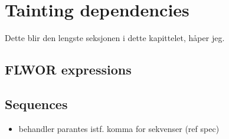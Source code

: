 \section{Tainting dependencies}
\label{sect:impl:tainting_deps}
Dette blir den lengste seksjonen i dette kapittelet, h\aa per jeg.
\subsection{FLWOR expressions}
\subsection{Sequences}
\label{sect:impl:td:seq}
\begin{itemize}
  \item behandler parantes istf. komma for sekvenser (ref spec) 
\end{itemize}